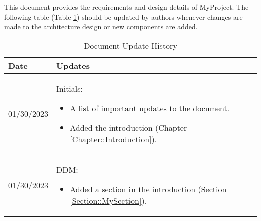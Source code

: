 This document provides the requirements and design details of MyProject.  
The following table (Table \ref{Table::UpdateHistory}) should be
updated by authors whenever changes are made to the architecture
design or new components are added.  

\begin{longtable}{|l||p{13.5cm}|}
\caption{Document Update History \label{Table::UpdateHistory}}\\
\hline
\textbf{Date} & \textbf{Updates} \\
\hline 
\endhead

01/30/2023 & Initials:
\begin{itemize}[topsep=0pt,itemsep=0pt,parsep=0pt,partopsep=0pt,leftmargin=12pt]
\item A list of important updates to the document.
\item Added the introduction (Chapter \ref{Chapter::Introduction}). 
\end{itemize} 
\\ \hline

01/30/2023 & DDM:
\begin{itemize}[topsep=0pt,itemsep=0pt,parsep=0pt,partopsep=0pt,leftmargin=12pt]
\item Added a section in the introduction (Section \ref{Section::MySection}).
\end{itemize} 
\\ \hline


\end{longtable}
